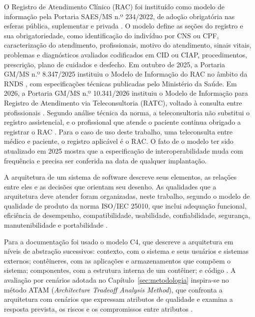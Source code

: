 O Registro de Atendimento Clínico (RAC) foi instituído como modelo de informação pela Portaria SAES/MS n.º 234/2022, de adoção obrigatória nas esferas pública, suplementar e privada \cite{portaria234}. O modelo define as seções do registro e sua obrigatoriedade, como identificação do indivíduo por CNS ou CPF, caracterização do atendimento, profissionais, motivo do atendimento, sinais vitais, problemas e diagnósticos avaliados codificados em CID ou CIAP, procedimentos, prescrição, plano de cuidados e desfecho. Em outubro de 2025, a Portaria GM/MS n.º 8.347/2025 instituiu o Modelo de Informação do RAC no âmbito da RNDS \cite{portaria8347}, com especificações técnicas publicadas pelo Ministério da Saúde. Em 2026, a Portaria GM/MS n.º 10.341/2026 instituiu o Modelo de Informação para Registro de Atendimento via Teleconsultoria (RATC), voltado à consulta entre profissionais \cite{portaria10341}. Segundo análise técnica da norma, a teleconsultoria não substitui o registro assistencial, e o profissional que atende o paciente continua obrigado a registrar o RAC \cite{cosems2026ratc}. Para o caso de uso deste trabalho, uma teleconsulta entre médico e paciente, o registro aplicável é o RAC. O fato de o modelo ter sido atualizado em 2025 mostra que a especificação de interoperabilidade muda com frequência e precisa ser conferida na data de qualquer implantação.



A arquitetura de um sistema de software descreve seus elementos, as relações entre eles e as decisões que orientam seu desenho. As qualidades que a arquitetura deve atender foram organizadas, neste trabalho, segundo o modelo de qualidade de produto da norma ISO/IEC 25010, que inclui adequação funcional, eficiência de desempenho, compatibilidade, usabilidade, confiabilidade, segurança, manutenibilidade e portabilidade \cite{iso25010}.

Para a documentação foi usado o modelo C4, que descreve a arquitetura em níveis de abstração sucessivos: contexto, com o sistema e seus usuários e sistemas externos; contêineres, com as aplicações e armazenamentos que compõem o sistema; componentes, com a estrutura interna de um contêiner; e código \cite{brownc4}. A avaliação por cenários adotada no Capítulo~\ref{sec:metodologia} inspira-se no método ATAM (\textit{Architecture Tradeoff Analysis Method}), que confronta a arquitetura com cenários que expressam atributos de qualidade e examina a resposta prevista, os riscos e os compromissos entre atributos \cite{kazman1998}.

